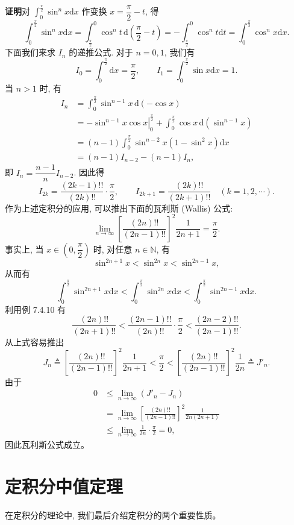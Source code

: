 \documentclass[UTF8, 12pt, fontset=fandol, oneside]{ctexart}
\begin{document}
\noindent\textbf{证明}\quad 对 $\int_0^{\frac{\pi}{2}}\sin^n x\mathrm dx$ 作变换 $x=\dfrac{\pi}{2}-t$, 得
\[
  \int_0^{\frac{\pi}{2}}\sin^n x\mathrm dx
  =\int_{\frac{\pi}{2}}^0 \cos^n t\,\mathrm d\left(\frac{\pi}{2}-t\right)
  =-\int_{\frac{\pi}{2}}^0 \cos^n t\mathrm dt
  =\int_0^{\frac{\pi}{2}}\cos^n x\mathrm dx.
\]
下面我们来求 $I_n$ 的递推公式. 对于 $n=0,1$, 我们有
\[
  I_0=\int_0^{\frac{\pi}{2}}\mathrm dx=\frac{\pi}{2},\qquad
  I_1=\int_0^{\frac{\pi}{2}}\sin x\mathrm dx=1.
\]
当 $n>1$ 时, 有
\[
\begin{aligned}
  I_n&=\int_0^{\frac{\pi}{2}}\sin^{n-1}x\,\mathrm d(-\cos x)\\
  &=-\left.\sin^{n-1}x\cos x\right|_0^{\frac{\pi}{2}}
  +\int_0^{\frac{\pi}{2}}\cos x\,\mathrm d(\sin^{n-1}x)\\
  &=(n-1)\int_0^{\frac{\pi}{2}}\sin^{n-2}x(1-\sin^2x)\mathrm dx\\
  &=(n-1)I_{n-2}-(n-1)I_n,
\end{aligned}
\]
即 $I_n=\dfrac{n-1}{n}I_{n-2}$. 因此得
\[
  I_{2k}=\frac{(2k-1)!!}{(2k)!!}\cdot\frac{\pi}{2},\qquad
  I_{2k+1}=\frac{(2k)!!}{(2k+1)!!}\quad(k=1,2,\cdots).
\]
作为上述定积分的应用, 可以推出下面的瓦利斯 (Wallis) 公式:
\[
  \lim_{n\to\infty}\left[\frac{(2n)!!}{(2n-1)!!}\right]^2\frac{1}{2n+1}=\frac{\pi}{2}.
\]
事实上, 当 $x\in\left(0,\dfrac{\pi}{2}\right)$ 时, 对任意 $n\in\mathbb N$, 有
\[
  \sin^{2n+1}x<\sin^{2n}x<\sin^{2n-1}x,
\]
从而有
\[
  \int_0^{\frac{\pi}{2}}\sin^{2n+1}x\mathrm dx
  <\int_0^{\frac{\pi}{2}}\sin^{2n}x\mathrm dx
  <\int_0^{\frac{\pi}{2}}\sin^{2n-1}x\mathrm dx.
\]
利用例 7.4.10 有
\[
  \frac{(2n)!!}{(2n+1)!!}
  <\frac{(2n-1)!!}{(2n)!!}\cdot\frac{\pi}{2}
  <\frac{(2n-2)!!}{(2n-1)!!}.
\]
从上式容易推出
\[
  J_n\triangleq\left[\frac{(2n)!!}{(2n-1)!!}\right]^2\frac{1}{2n+1}
  <\frac{\pi}{2}
  <\left[\frac{(2n)!!}{(2n-1)!!}\right]^2\frac{1}{2n}\triangleq J'_n.
\]
由于
\[
\begin{aligned}
  0&\leq\lim_{n\to\infty}(J'_n-J_n)\\
  &=\lim_{n\to\infty}
  \left[\frac{(2n)!!}{(2n-1)!!}\right]^2\frac{1}{2n(2n+1)}\\
  &\leq\lim_{n\to\infty}\frac{1}{2n}\cdot\frac{\pi}{2}=0,
\end{aligned}
\]
因此瓦利斯公式成立。

\section{定积分中值定理}

在定积分的理论中, 我们最后介绍定积分的两个重要性质。
\end{document}
